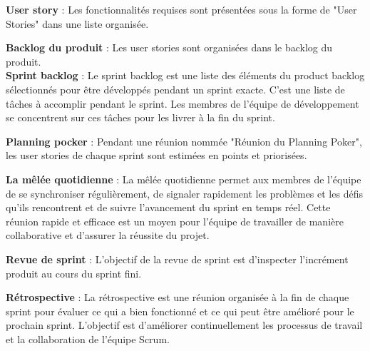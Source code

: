 \noindent\textbf{User story} : Les fonctionnalités requises sont présentées sous la forme de "User Stories" dans une liste organisée.

\noindent\textbf{Backlog du produit} : Les user stories sont organisées dans le backlog du produit.\\

\noindent\textbf{Sprint backlog} : Le sprint backlog est une liste des éléments du product backlog sélectionnés pour être développés pendant un sprint exacte. C'est une liste de tâches à accomplir pendant le sprint. Les membres de l'équipe de développement se concentrent sur ces tâches pour les livrer à la fin du sprint.

\noindent\textbf{Planning pocker} : Pendant une réunion nommée "Réunion du Planning Poker", les user stories de chaque sprint sont estimées en points et priorisées.

\noindent\textbf{La mêlée quotidienne} : La mêlée quotidienne permet aux membres de l'équipe de se synchroniser régulièrement, de signaler rapidement les problèmes et les défis qu'ils rencontrent et de suivre l'avancement du sprint en temps réel. Cette réunion rapide et efficace est un moyen pour l'équipe de travailler de manière collaborative et d'assurer la réussite du projet.

\noindent\textbf{Revue de sprint} : L’objectif de la revue de sprint est d’inspecter l’incrément produit au cours du sprint fini.

\noindent\textbf{Rétrospective} : La rétrospective est une réunion organisée à la fin de chaque sprint pour évaluer ce qui a bien fonctionné et ce qui peut être amélioré pour le prochain sprint. L'objectif est d'améliorer continuellement les processus de travail et la collaboration de l'équipe Scrum.


